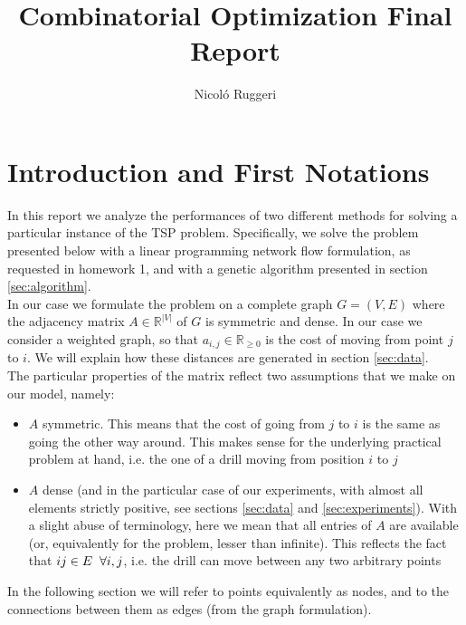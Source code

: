 \documentclass{article}
\author{Nicol\'o Ruggeri}
\title{Combinatorial Optimization Final Report}
\date{\null}
\begin{document}
 
        


\maketitle

\section{Introduction and  First Notations}
In this report we analyze the performances of two different methods for solving a particular instance of the TSP problem. Specifically, we solve the problem presented below with a linear programming network flow formulation, as requested in homework 1, and with a genetic algorithm presented in section \ref{sec:algorithm}. \\
In our case we formulate the problem on a complete graph $G = (V, E)$ where the adjacency matrix $A \in \mathbb{R}^{|V|}$ of $G$ is symmetric and dense. In our case we consider a weighted graph, so that $a_{i,j} \in \mathbb{R}_{\ge 0}$ is the cost of moving from point $j$ to $i$. We will explain how these distances are generated in section \ref{sec:data}.\\
The particular properties of the matrix reflect two assumptions that we make on our model, namely:
\begin{itemize}
\item $A$ symmetric. This means that the cost of going from $j$ to $i$ is the same as going the other way around. This makes sense for the underlying practical problem at hand, i.e. the one of a drill moving from position $i$ to $j$
\item $A$ dense (and in the particular case of our experiments, with almost all elements strictly positive, see sections \ref{sec:data} and \ref{sec:experiments}). With a slight abuse of terminology, here we mean that all entries of $A$ are available (or, equivalently for the problem, lesser than infinite). This reflects the fact that $ij \in E \hspace{2mm} \forall i, j$, i.e. the drill can move between any two arbitrary points
\end{itemize}
In the following section we will refer to points equivalently as nodes, and to the connections between them as edges (from the graph formulation).
\end{document}
